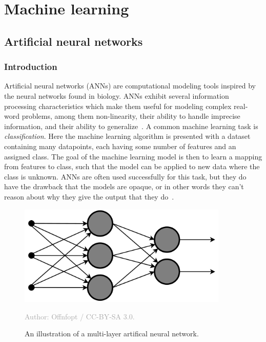 \documentclass{kththesis}
\newcommand{\source}[1]{\vspace{-5mm}\caption*{\textcolor{darkgray}{Author: {#1}}\vspace{-7mm}} }
\begin{document}
\section{Machine learning}
\subsection{Artificial neural networks}
\subsubsection{Introduction}
Artificial neural networks (ANNs) are computational modeling tools inspired by the neural networks found in biology. ANNs exhibit several information processing characteristics which make them useful for modeling complex real-word problems, among them non-linearity, their ability to handle imprecise information, and their ability to generalize~\cite{ANNFundamentals}. A common machine learning task is \textit{classification}. Here the machine learning algorithm is presented with a dataset containing many datapoints, each having some number of features and an assigned class. The goal of the machine learning model is then to learn a mapping from features to class, such that the model can be applied to new data where the class is unknown. ANNs are often used successfully for this task, but they do have the drawback that the models are opaque, or in other words they can't reason about why they give the output that they do~\cite[p. 3, 8--9]{weiss1990empirical}.

\begin{figure}
  \begin{center}
    \includegraphics[width=100mm]{img/neural_network.png}
    \caption{An illustration of a multi-layer artifical neural network. }
    \source{Offnfopt / CC-BY-SA 3.0.}
    \label{fig:mlf}
  \end{center}
\end{figure}
\end{document}

